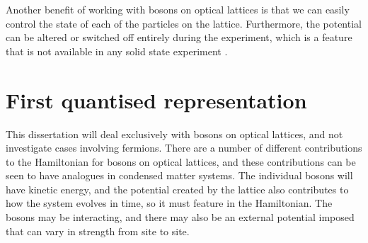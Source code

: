 \documentclass[a4paper, 10pt]{article}
\theoremstyle{plain}
\begin{document}
Another benefit of working with bosons on optical lattices is that we can easily
control the state of each of the particles on the lattice. Furthermore, the
potential can be altered or switched off entirely during the experiment, which
is a feature that is not available in any solid state experiment
\cite{Morsch2006}.


\section{First quantised representation}

This dissertation will deal exclusively with bosons on optical lattices, and not
investigate cases involving fermions. There are a number of different
contributions to the Hamiltonian for bosons on optical lattices, and these
contributions can be seen to have analogues in condensed matter systems. The
individual bosons will have kinetic energy, and the potential created by the
lattice also contributes to how the system evolves in time, so it must feature
in the Hamiltonian. The bosons may be interacting, and there may also be an
external potential imposed that can vary in strength from site to site.
\end{document}
